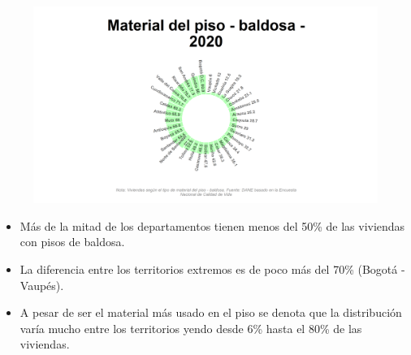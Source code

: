     \begin{figure}[H]
        \caption[Viviendas con piso de baldosa por departamento para 2020 ]{\label{piso_baldosa_dptos} }
        \begin{center}
        \includegraphics[width=\textwidth,keepaspectratio]{img/var_173_static.png}
        \end{center}
    \end{figure}
            \begin{itemize}
                    \item Más de la mitad de los departamentos tienen menos del 50\% de las viviendas con pisos de baldosa.
                    \item La diferencia entre los territorios extremos es de poco más del 70\% (Bogotá - Vaupés).
                    \item A pesar de ser el material más usado en el piso se denota que la distribución varía mucho entre los territorios yendo desde 6\% hasta el 80\% de las viviendas.
                    \end{itemize}

